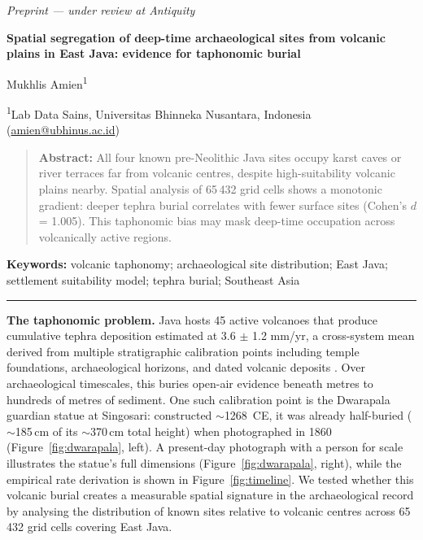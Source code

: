 \documentclass[12pt]{article}
\begin{document}
\begin{center}
{\small\color{gray}\textit{Preprint --- under review at Antiquity}}

\vspace{6pt}

{\large\bfseries Spatial segregation of deep-time archaeological sites from volcanic plains in East Java: evidence for taphonomic burial}

\vspace{6pt}

Mukhlis Amien\textsuperscript{1}

\vspace{4pt}

{\small\textsuperscript{1}Lab Data Sains, Universitas Bhinneka Nusantara, Indonesia (\href{mailto:amien@ubhinus.ac.id}{amien@ubhinus.ac.id})}
\end{center}

\begin{quote}
\small\textbf{Abstract:} All four known pre-Neolithic Java sites occupy karst caves or river terraces far from volcanic centres, despite high-suitability volcanic plains nearby. Spatial analysis of 65\,432 grid cells shows a monotonic gradient: deeper tephra burial correlates with fewer surface sites (Cohen's $d$ = 1.005). This taphonomic bias may mask deep-time occupation across volcanically active regions.
\end{quote}

\textbf{Keywords:} volcanic taphonomy; archaeological site distribution; East Java; settlement suitability model; tephra burial; Southeast Asia

\vspace{6pt}
\hrule
\vspace{6pt}


\textbf{The taphonomic problem.}
Java hosts 45 active volcanoes that produce cumulative tephra deposition estimated at 3.6 $\pm$ 1.2 mm/yr, a cross-system mean derived from multiple stratigraphic calibration points including temple foundations, archaeological horizons, and dated volcanic deposits \citep{Amien2026a}.
Over archaeological timescales, this buries open-air evidence beneath metres to hundreds of metres of sediment.
One such calibration point is the Dwarapala guardian statue at Singosari: constructed $\sim$1268~CE, it was already half-buried ($\sim$185\,cm of its $\sim$370\,cm total height) when photographed in 1860 (Figure~\ref{fig:dwarapala}, left). A present-day photograph with a person for scale illustrates the statue's full dimensions (Figure~\ref{fig:dwarapala}, right), while the empirical rate derivation is shown in Figure~\ref{fig:timeline}.
We tested whether this volcanic burial creates a measurable spatial signature in the archaeological record by analysing the distribution of known sites relative to volcanic centres across 65\,432 grid cells covering East Java.
\end{document}
